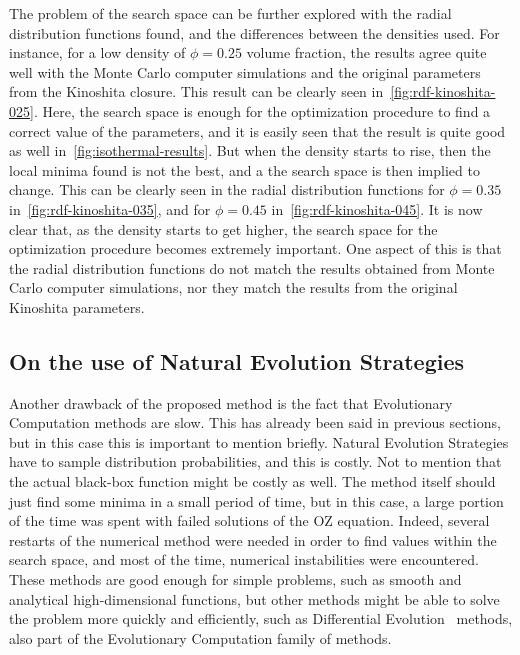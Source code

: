 The problem of the search space can be further explored with the radial distribution 
functions found, and the differences between the densities used. For instance, for a low 
density of \(\phi=0.25\) volume fraction, the results agree quite well with the Monte Carlo 
computer simulations and the original parameters from the Kinoshita closure. This result 
can be clearly seen in~\autoref{fig:rdf-kinoshita-025}. Here, the search space is enough for 
the optimization procedure to find a correct value of the parameters, and it is easily seen 
that the result is quite good as well in~\autoref{fig:isothermal-results}. But when the 
density starts to rise, then the local minima found is not the best, and a the search space 
is then implied to change. This can be clearly seen in the radial distribution functions 
for \(\phi=0.35\) in~\autoref{fig:rdf-kinoshita-035}, and for \(\phi=0.45\) 
in~\autoref{fig:rdf-kinoshita-045}. It is now clear that, as the density starts to get 
higher, the search space for the optimization procedure becomes extremely important. One 
aspect of this is that the radial distribution functions do not match the results obtained 
from Monte Carlo computer simulations, nor they match the results from the original 
Kinoshita parameters.

\subsection{On the use of Natural Evolution Strategies}
Another drawback of the proposed method is the fact that Evolutionary Computation methods 
are slow. This has already been said in previous sections, but in this case this is 
important to mention briefly. Natural Evolution Strategies have to sample distribution 
probabilities, and this is costly. Not to mention that the actual black-box function might 
be costly as well. The method itself should just find some minima in a small period of 
time, but in this case, a large portion of the time was spent with failed solutions of the 
OZ equation. Indeed, several restarts of the numerical method were 
needed in order to find values within the search space, and most of the time, numerical 
instabilities were encountered. These methods are good enough for simple problems, such as 
smooth and analytical high-dimensional functions, but other methods might be able to solve 
the problem more quickly and efficiently, such as Differential 
Evolution~\cite{dasDifferentialEvolutionSurvey2011} methods, also part of the 
Evolutionary Computation family of methods.

